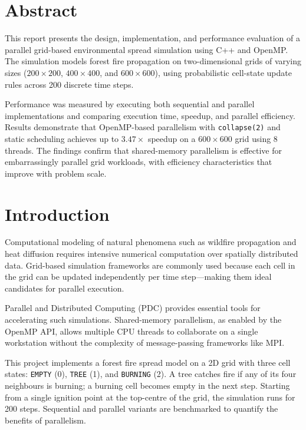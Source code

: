 \documentclass[12pt,a4paper]{article}
\begin{document}
\section{Abstract}

This report presents the design, implementation, and performance evaluation of a
parallel grid-based environmental spread simulation using C++ and OpenMP. The
simulation models forest fire propagation on two-dimensional grids of varying sizes
($200\times200$, $400\times400$, and $600\times600$), using probabilistic cell-state
update rules across 200 discrete time steps.

Performance was measured by executing both sequential and parallel implementations
and comparing execution time, speedup, and parallel efficiency. Results demonstrate
that OpenMP-based parallelism with \texttt{collapse(2)} and static scheduling achieves
up to $3.47\times$ speedup on a $600\times600$ grid using 8 threads. The findings
confirm that shared-memory parallelism is effective for embarrassingly parallel grid
workloads, with efficiency characteristics that improve with problem scale.

\section{Introduction}

Computational modeling of natural phenomena such as wildfire propagation and heat
diffusion requires intensive numerical computation over spatially distributed data.
Grid-based simulation frameworks are commonly used because each cell in the grid
can be updated independently per time step---making them ideal candidates for
parallel execution.

Parallel and Distributed Computing (PDC) provides essential tools for accelerating
such simulations. Shared-memory parallelism, as enabled by the OpenMP API, allows
multiple CPU threads to collaborate on a single workstation without the complexity of
message-passing frameworks like MPI.

This project implements a forest fire spread model on a 2D grid with three cell states:
\texttt{EMPTY} (0), \texttt{TREE} (1), and \texttt{BURNING} (2). A tree catches fire
if any of its four neighbours is burning; a burning cell becomes empty in the next step.
Starting from a single ignition point at the top-centre of the grid, the simulation runs
for 200 steps. Sequential and parallel variants are benchmarked to quantify the
benefits of parallelism.
\end{document}
